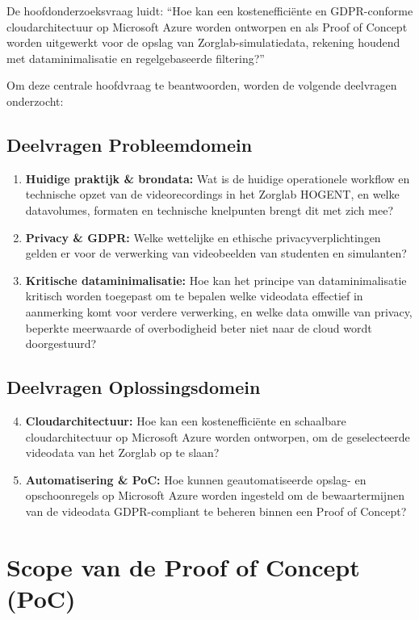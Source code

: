 De hoofdonderzoeksvraag luidt: 
“Hoe kan een kostenefficiënte en GDPR-conforme cloudarchitectuur op Microsoft Azure worden ontworpen en als Proof of Concept worden uitgewerkt voor de opslag van Zorglab-simulatiedata, rekening houdend met dataminimalisatie en regelgebaseerde filtering?”

Om deze centrale hoofdvraag te beantwoorden, worden de volgende deelvragen onderzocht:

\subsection*{Deelvragen Probleemdomein}
\begin{enumerate}
    \item \textbf{Huidige praktijk \& brondata:} Wat is de huidige operationele workflow en technische opzet van de videorecordings in het Zorglab HOGENT, en welke datavolumes, formaten en technische knelpunten brengt dit met zich mee?
    \item \textbf{Privacy \& GDPR:} Welke wettelijke en ethische privacyverplichtingen gelden er voor de verwerking van videobeelden van studenten en simulanten?
    \item \textbf{Kritische dataminimalisatie:} Hoe kan het principe van dataminimalisatie kritisch worden toegepast om te bepalen welke videodata effectief in aanmerking komt voor verdere verwerking, en welke data omwille van privacy, beperkte meerwaarde of overbodigheid beter niet naar de cloud wordt doorgestuurd?
\end{enumerate}

\subsection*{Deelvragen Oplossingsdomein}
\begin{enumerate}
    \setcounter{enumi}{3}
    \item \textbf{Cloudarchitectuur:} Hoe kan een kostenefficiënte en schaalbare cloudarchitectuur op Microsoft Azure worden ontworpen, om de geselecteerde videodata van het Zorglab op te slaan?
    \item \textbf{Automatisering \& PoC:} Hoe kunnen geautomatiseerde opslag- en opschoonregels op Microsoft Azure worden ingesteld om de bewaartermijnen van de videodata GDPR-compliant te beheren binnen een Proof of Concept?
\end{enumerate}

\section{Scope van de Proof of Concept (PoC)}%
\label{subsec:bp_scope}

